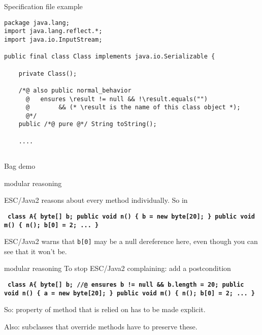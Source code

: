 \documentclass[
pdf,
nocolorBG,
slideColor,
cok,
]{prosper}
\newcommand{\code}[1]{{\rm \texttt{\textbf{\scriptsize #1}}}}
\newcommand{\bsl}{\char'134}
\newcommand{\result}{\bsl result}
\begin{document}
\begin{slide}{Specification file example}
\vspace*{-6ex}
\tiny
\begin{verbatim}
package java.lang;
import java.lang.reflect.*;
import java.io.InputStream;

public final class Class implements java.io.Serializable {

    private Class();

    /*@ also public normal_behavior
      @   ensures \result != null && !\result.equals("")
      @        && (* \result is the name of this class object *);
      @*/
    public /*@ pure @*/ String toString();

    ....


\end{verbatim}
\end{slide}


\begin{slide}{Bag demo}

\end{slide}

\begin{slide}{modular reasoning}
\vspace*{-6ex}

ESC/Java2 reasons about every method individually.
So in

\begin{alltt}\code{ class A\{
  byte[] b;
  public void n() \{ b = new byte[20]; \}
  public void m() \{ n();
                    b[0] = 2;
                    ...       \}
}
\end{alltt} %

ESC/Java2 warns that \texttt{b[0]} may be a null dereference here,
even though you can see that it won't be.
\end{slide}

\begin{slide}{modular reasoning}
\vspace*{-6ex}
To stop ESC/Java2 complaining: add a postcondition
\begin{alltt}\code{ class A\{
  byte[] b;
 {\green //@ ensures b != null && b.length = 20;}
  public void n() \{ a = new byte[20]; \}
  public void m() \{ n();
                    b[0] = 2;
                    ...       \} 
}
\end{alltt} %
So: property of method that is relied on has to be made explicit.

Also: subclasses that override methods have to preserve these.

\end{slide}
\end{document}

